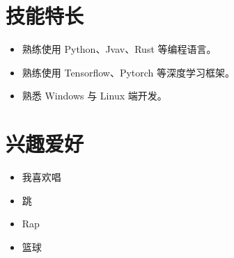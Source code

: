 \documentclass[11pt]{article}
\newlength{\iconwidth}
\begin{document}
    \begin{minipage}[t]{0.6\textwidth}
        \section[技能特长]{\makebox[\iconwidth][c]{\color{primary_color}{\faWrench}}\quad 技能特长}
        \begin{itemize}
        \setlength{\itemsep}{0.5em}
            \item 熟练使用 Python、Jvav、Rust 等编程语言。
            \item 熟练使用 Tensorflow、Pytorch 等深度学习框架。
            \item 熟悉 Windows 与 Linux 端开发。
        \end{itemize}
    \end{minipage}
    \hfill
    \begin{minipage}[t]{0.35\textwidth}
        \section[兴趣爱好]{\makebox[\iconwidth][c]{\color{primary_color}{\faStar}}\quad 兴趣爱好}
        \begin{itemize}
        \setlength{\itemsep}{0.5em}
            \item 我喜欢唱
            \item 跳
            \item Rap
            \item 篮球
        \end{itemize}
    \end{minipage}
    

\end{document}
